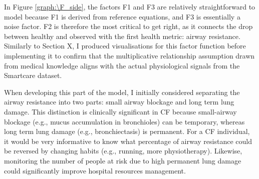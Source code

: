 In Figure \ref{graph:\F_side}, the factors F1 and F3 are relatively straightforward to model because F1 is derived from reference equations, and F3 is essentially a noise factor. F2 is therefore the most critical to get right, as it connects the drop between healthy and observed \F with the first health metric: airway resistance. Similarly to Section X, I produced visualisations for this factor function before implementing it to confirm that the multiplicative relationship assumption drawn from medical knowledge aligns with the actual physiological signals from the Smartcare dataset.

When developing this part of the model, I initially considered separating the airway resistance into two parts: small airway blockage and long term lung damage. This distinction is clinically significant in CF because small-airway blockage (e.g., mucus accumulation in bronchioles) can be temporary, whereas long term lung damage (e.g., bronchiectasis) is permanent. For a CF individual, it would be very informative to know what percentage of airway resistance could be reversed by changing habits (e.g., running, more physiotherapy). Likewise, monitoring the number of people at risk due to high permanent lung damage could significantly improve hospital resources management.

